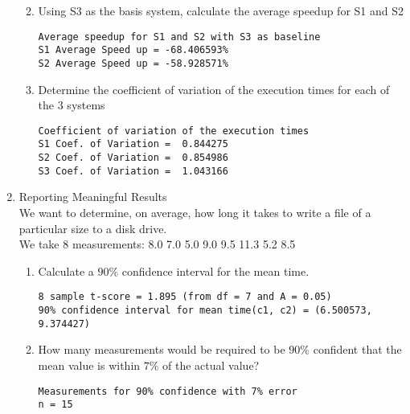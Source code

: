 \documentclass[11pt]{article}
\begin{document}
\begin{enumerate}[(1)]
\begin{enumerate}[a]
\begin{verbatim}
\end{verbatim}
\item Using S3 as the basis system, calculate the average speedup for S1 and S2\\
\begin{verbatim}
Average speedup for S1 and S2 with S3 as baseline
S1 Average Speed up = -68.406593%
S2 Average Speed up = -58.928571%

\end{verbatim}
\item Determine the coefficient of variation of the execution times for each of the 3 systems\\
\begin{verbatim}
Coefficient of variation of the execution times
S1 Coef. of Variation =  0.844275
S2 Coef. of Variation =  0.854986
S3 Coef. of Variation =  1.043166

\end{verbatim}
\end{enumerate}


\item Reporting Meaningful Results\\
We want to determine, on average, how long it takes to write a file of a particular size to a disk drive.\\
We take 8 measurements: 8.0 7.0 5.0 9.0 9.5 11.3 5.2 8.5 \\

\begin{enumerate}[label=\alph*]
\item Calculate a $90\%$ confidence interval for the mean time.\\
\begin{verbatim}
8 sample t-score = 1.895 (from df = 7 and A = 0.05)
90% confidence interval for mean time(c1, c2) = (6.500573, 9.374427)
\end{verbatim}
\item How many measurements would be required to be $90\%$ confident that the mean value is within $7\%$ of the actual value?\\
\begin{verbatim}
Measurements for 90% confidence with 7% error
n = 15
\end{verbatim}
\end{enumerate}

\end{enumerate}



\end{document}
